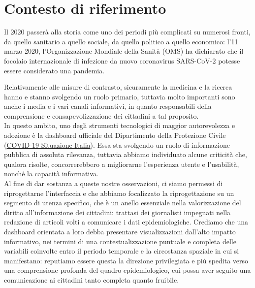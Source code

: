 \documentclass[../../main.tex]{subfiles}
\begin{document}
\section{Contesto di riferimento}
Il 2020 passerà alla storia come uno dei periodi più complicati su numerosi fronti, da quello sanitario a quello sociale, da quello politico a quello economico: l'11 marzo 2020, l'Organizzazione Mondiale della Sanità (OMS) ha dichiarato che il focolaio internazionale di infezione da nuovo coronavirus SARS-CoV-2 potesse essere considerato una pandemia.

Relativamente alle misure di contrasto, sicuramente la medicina e la ricerca hanno e stanno svolgendo un ruolo primario, tuttavia molto importanti sono anche i media e i vari canali informativi, in quanto responsabili della comprensione e consapevolizzazione dei cittadini a tal proposito.\\
In questo ambito, uno degli strumenti tecnologici di maggior autorevolezza e adozione è la dashboard ufficiale del Dipartimento della Protezione Civile (\href{https://opendatadpc.maps.arcgis.com/apps/opsdashboard/index.html#/b0c68bce2cce478eaac82fe38d4138b1}{COVID-19 Situazione Italia}). Essa sta svolgendo un ruolo di informazione pubblica di assoluta rilevanza, tuttavia abbiamo individuato alcune criticità che, qualora risolte, concorrerebbero a migliorarne l'esperienza utente e l'usabilità, nonché la capacità informativa.\\
Al fine di dar sostanza a queste nostre osservazioni, ci siamo permessi di riprogettarne l'interfaccia e che abbiamo focalizzato la riprogettazione su un segmento di utenza specifico, che è un anello essenziale nella valorizzazione del diritto all'informazione dei cittadini: trattasi dei giornalisti impegnati nella redazione di articoli volti a comunicare i dati epidemiologiche.
Crediamo che una dashboard orientata a loro debba presentare visualizzazioni dall'alto impatto informativo, nei termini di una contestualizzazione puntuale e completa delle variabili coinvolte entro il periodo temporale e la circostanza spaziale in cui si manifestano: reputiamo essere questa la direzione privilegiata e più spedita verso una comprensione profonda del quadro epidemiologico, cui possa aver seguito una comunicazione ai cittadini tanto completa quanto fruibile.
\end{document}
